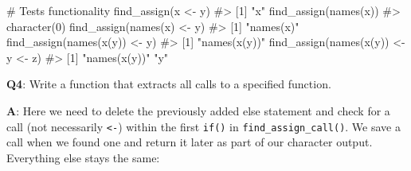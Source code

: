 \documentclass[
]{krantz}
\makeatletter
\newenvironment{Shaded}{\begin{snugshade}}{\end{snugshade}}
\newcommand{\CommentTok}[1]{\textcolor[rgb]{0.56,0.35,0.01}{\textit{#1}}}
\newcommand{\KeywordTok}[1]{\textcolor[rgb]{0.13,0.29,0.53}{\textbf{#1}}}
\newcommand{\NormalTok}[1]{#1}
\newcommand{\StringTok}[1]{\textcolor[rgb]{0.31,0.60,0.02}{#1}}
\newenvironment{kframe}{%
\medskip{}
\setlength{\fboxsep}{.8em}
 \def\at@end@of@kframe{}%
 \ifinner\ifhmode%
  \def\at@end@of@kframe{\end{minipage}}%
  \begin{minipage}{\columnwidth}%
 \fi\fi%
 \def\FrameCommand##1{\hskip\@totalleftmargin \hskip-\fboxsep
 \colorbox{shadecolor}{##1}\hskip-\fboxsep
     \hskip-\linewidth \hskip-\@totalleftmargin \hskip\columnwidth}%
 \MakeFramed {\advance\hsize-\width
   \@totalleftmargin\z@ \linewidth\hsize
   \@setminipage}}%
 {\par\unskip\endMakeFramed%
 \at@end@of@kframe}
\renewenvironment{Shaded}{\begin{kframe}}{\end{kframe}}
\renewcommand{\KeywordTok} [1]{\textcolor[rgb]{0.00,0.44,0.13}{{#1}}}
\renewcommand{\StringTok}  [1]{\textcolor[rgb]{0.25,0.44,0.63}{{#1}}}
\renewcommand{\CommentTok} [1]{\textcolor[rgb]{0.38,0.63,0.69}{{#1}}}
\renewcommand{\NormalTok}  [1]{{#1}}
\makeatother
\begin{document}
\begin{Shaded}
\begin{Highlighting}[]
\CommentTok{# Tests functionality}
\KeywordTok{find_assign}\NormalTok{(x <-}\StringTok{ }\NormalTok{y)}
\CommentTok{#> [1] "x"}
\KeywordTok{find_assign}\NormalTok{(}\KeywordTok{names}\NormalTok{(x))}
\CommentTok{#> character(0)}
\KeywordTok{find_assign}\NormalTok{(}\KeywordTok{names}\NormalTok{(x) <-}\StringTok{ }\NormalTok{y)}
\CommentTok{#> [1] "names(x)"}
\KeywordTok{find_assign}\NormalTok{(}\KeywordTok{names}\NormalTok{(}\KeywordTok{x}\NormalTok{(y)) <-}\StringTok{ }\NormalTok{y)}
\CommentTok{#> [1] "names(x(y))"}
\KeywordTok{find_assign}\NormalTok{(}\KeywordTok{names}\NormalTok{(}\KeywordTok{x}\NormalTok{(y)) <-}\StringTok{ }\NormalTok{y <-}\StringTok{ }\NormalTok{z)}
\CommentTok{#> [1] "names(x(y))" "y"}
\end{Highlighting}
\end{Shaded}

\textbf{{Q4}}: Write a function that extracts all calls to a specified function.

\textbf{{A}}: Here we need to delete the previously added else statement and check for a call (not necessarily \texttt{\textless{}-}) within the first \texttt{if()} in \texttt{find\_assign\_call()}. We save a call when we found one and return it later as part of our character output. Everything else stays the same:
\end{document}
